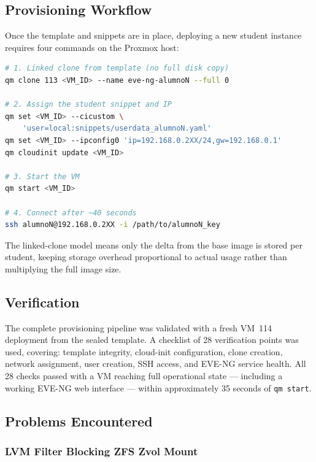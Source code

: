 \newpage
\subsection{Provisioning Workflow}

Once the template and snippets are in place, deploying a new student instance
requires four commands on the Proxmox host:

\begin{lstlisting}[language=bash, caption={Provisioning a student EVE-NG VM from the template}]
# 1. Linked clone from template (no full disk copy)
qm clone 113 <VM_ID> --name eve-ng-alumnoN --full 0

# 2. Assign the student snippet and IP
qm set <VM_ID> --cicustom \
    'user=local:snippets/userdata_alumnoN.yaml'
qm set <VM_ID> --ipconfig0 'ip=192.168.0.2XX/24,gw=192.168.0.1'
qm cloudinit update <VM_ID>

# 3. Start the VM
qm start <VM_ID>

# 4. Connect after ~40 seconds
ssh alumnoN@192.168.0.2XX -i /path/to/alumnoN_key
\end{lstlisting}

The linked-clone model means only the delta from the base image is stored per
student, keeping storage overhead proportional to actual usage rather than
multiplying the full image size.

\subsection{Verification}

The complete provisioning pipeline was validated with a fresh VM~114 deployment
from the sealed template. A checklist of 28 verification points was used, covering:
template integrity, cloud-init configuration, clone creation, network assignment,
user creation, SSH access, and EVE-NG service health. All 28 checks passed
with a VM reaching full operational state --- including a working EVE-NG web
interface --- within approximately 35 seconds of \texttt{qm start}.

\subsection{Problems Encountered}

\subsubsection{LVM Filter Blocking ZFS Zvol Mount}

